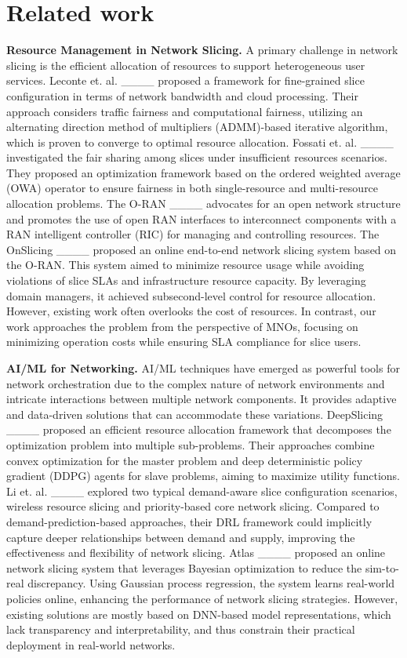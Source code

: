 \section{Related work}
\textbf{Resource Management in Network Slicing.} A primary challenge in network slicing is the efficient allocation of resources to support heterogeneous user services. Leconte et. al. ____ proposed a framework for fine-grained slice configuration in terms of network bandwidth and cloud processing. Their approach considers traffic fairness and computational fairness, utilizing an alternating direction method of multipliers (ADMM)-based iterative algorithm, which is proven to converge to optimal resource allocation. Fossati et. al. ____ investigated the fair sharing among slices under insufficient resources scenarios. They proposed an optimization framework based on the ordered weighted average (OWA) operator to ensure fairness in both single-resource and multi-resource allocation problems. The O-RAN ____ advocates for an open network structure and promotes the use of open RAN interfaces to interconnect components with a RAN intelligent controller (RIC) for managing and controlling resources. The OnSlicing ____ proposed an online end-to-end network slicing system based on the O-RAN. This system aimed to minimize resource usage while avoiding violations of slice SLAs and infrastructure resource capacity. By leveraging domain managers, it achieved subsecond-level control for resource allocation. However, existing work often overlooks the cost of resources. In contrast, our work approaches the problem from the perspective of MNOs, focusing on minimizing operation costs while ensuring SLA compliance for slice users. 

\textbf{AI/ML for Networking.} AI/ML techniques have emerged as powerful tools for network orchestration due to the complex nature of network environments and intricate interactions between multiple network components. It provides adaptive and data-driven solutions that can accommodate these variations. DeepSlicing ____ proposed an efficient resource allocation framework that decomposes the optimization problem into multiple sub-problems. Their approaches combine convex optimization for the master problem and deep deterministic policy gradient (DDPG) agents for slave problems, aiming to maximize utility functions. Li et. al. ____ explored two typical demand-aware slice configuration scenarios, wireless resource slicing and priority-based core network slicing. Compared to demand-prediction-based approaches, their DRL framework could implicitly capture deeper relationships between demand and supply, improving the effectiveness and flexibility of network slicing. Atlas ____ proposed an online network slicing system that leverages Bayesian optimization to reduce the sim-to-real discrepancy. Using Gaussian process regression, the system learns real-world policies online, enhancing the performance of network slicing strategies. 
However, existing solutions are mostly based on DNN-based model representations, which lack transparency and interpretability, and thus constrain their practical deployment in real-world networks.